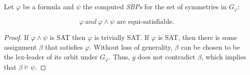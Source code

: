 %
%

\begin{theorem}
 \label{theorem:satisfiability_preservation_SBPs}
 Let $\varphi$ be a formula and $\psi$ the computed \textit{SBPs} for the set of symmetries in $G_{\varphi}$:
 
 $$\varphi~and ~\varphi \wedge \psi \text{ are equi-satisfiable}.$$
\end{theorem}
\begin{proof}
 If $\varphi \wedge \psi$ is SAT then $\varphi$ is trivially SAT. If
 $\varphi$ is SAT, then there is some assignment $\beta$ that satisfies $\varphi$.
 Without loss of generality, $\beta$ can be chosen to be the lex-leader of its
 orbit under $G_{\varphi}$. Thus, $g$ does not contradict $\beta$, which implies that
 $\beta \models \psi$.
\end{proof}



%
%
%

